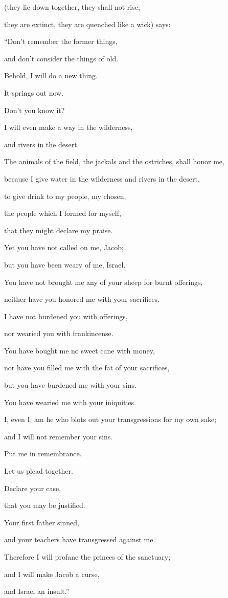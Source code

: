 {\par }{\QB (they lie down together, they shall not rise;
\par }{\QB they are extinct, they are quenched like a wick) says:
\par }{\Q {}“Don’t remember the former things,
\par }{\QB and don’t consider the things of old.
\par }{\Q {}Behold, I will do a new thing.
\par }{\QB It springs out now.
\par }{\QB Don’t you know it?
\par }{\Q I will even make a way in the wilderness,
\par }{\QB and rivers in the desert.
\par }{\Q {}The animals of the field, the jackals and the ostriches, shall honor me,
\par }{\QB because I give water in the wilderness and rivers in the desert,
\par }{\QB to give drink to my people, my chosen,
\par }{\QB {}the people which I formed for myself,
\par }{\QB that they might declare my praise.
\par }{\BB \par }{\Q {}Yet you have not called on me, Jacob;
\par }{\QB but you have been weary of me, Israel.
\par }{\Q {}You have not brought me any of your sheep for burnt offerings,
\par }{\QB neither have you honored me with your sacrifices.
\par }{\Q I have not burdened you with offerings,
\par }{\QB nor wearied you with frankincense.
\par }{\Q {}You have bought me no sweet cane with money,
\par }{\QB nor have you filled me with the fat of your sacrifices,
\par }{\Q but you have burdened me with your sins.
\par }{\QB You have wearied me with your iniquities.
\par }{\BB \par }{\Q {}I, even I, am he who blots out your transgressions for my own sake;
\par }{\QB and I will not remember your sins.
\par }{\Q {}Put me in remembrance.
\par }{\QB Let us plead together.
\par }{\Q Declare your case,
\par }{\QB that you may be justified.
\par }{\Q {}Your first father sinned,
\par }{\QB and your teachers have transgressed against me.
\par }{\Q {}Therefore I will profane the princes of the sanctuary;
\par }{\QB and I will make Jacob a curse,
\par }{\QB and Israel an insult.”

}
